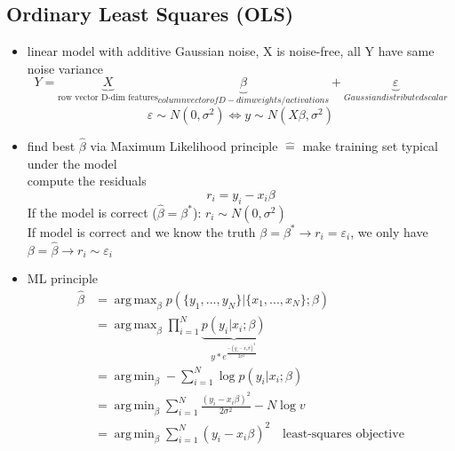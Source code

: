 \documentclass[11pt]{article}
\DeclareMathOperator*{\argmin}{arg\,min}
\DeclareMathOperator*{\argmax}{arg\,max}
\begin{document}
\begin{itemize}
    \subsection{Ordinary Least Squares (OLS)}
      \begin{itemize}
        \item linear model with additive Gaussian noise, X is noise-free,
        all Y have same noise variance
        \begin{equation*}
          Y = \underbrace{X}_{\text{row vector D-dim features}} \underbrace
          {\beta}_{column vector of D-dim weights/activations} +
          \underbrace{\varepsilon}_{Gaussian distributed scalar}
        \end{equation*}
        \begin{equation*}
          \varepsilon \sim N(0, \sigma^2) \iff y \sim N(X\beta, \sigma^2)
        \end{equation*}
        \item find best $\hat{\beta}$ via Maximum Likelihood principle $\hat{=}$
        make training set typical under the model \\
        compute the residuals
        \begin{equation*}
          r_i = y_i - x_i\beta
        \end{equation*}
        If the model is correct ($\hat{\beta}=\beta^*$): $r_i \sim N(0, \sigma^2)$ \\
        If model is correct and we know the truth $\beta = \beta^* \rightarrow r_i =
        \varepsilon_i$, we only have $\beta = \hat{\beta} \rightarrow r_i \sim \varepsilon_i$
        \item ML principle
        \begin{equation*}
          \begin{align*}
            \hat{\beta}&= \argmax_{\beta} p(\{ y_1,...,y_N\} |\{ x_1,...,x_N\};\beta) \\
            &= \argmax_{\beta} \prod_{i=1}^{N} \underbrace{p(y_i|x_i;\beta)}_{
            y*e^{\frac{-(y_i-x_i\beta)^2}{2\sigma^2}}}
             \\
            &= \argmin_{\beta} - \sum_{i=1}^N \log p(y_i|x_i; \beta) \\
            &= \argmin_{\beta} \sum_{i=1}^N \frac{(y_i-x_i\beta)^2}{2\sigma^2} -
            N \log v \\
            &= \argmin_{\beta} \sum_{i=1}^N (y_i-x_i\beta)^2 \quad \text{least-squares objective}
          \end{align*}

\end{equation*}
\end{itemize}
\end{itemize}
\end{document}

